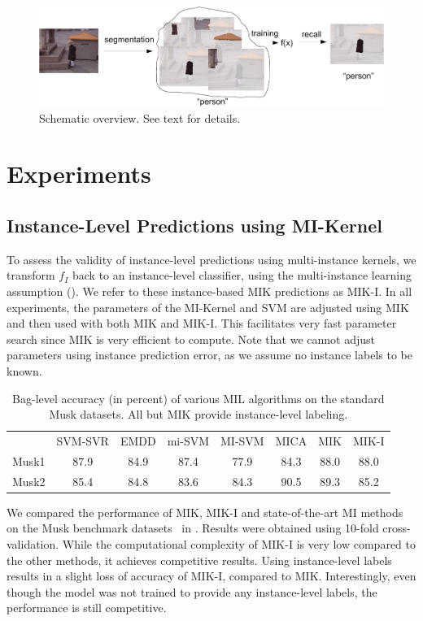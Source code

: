 \begin{figure}[tbp]
	\begin{center}
        \includegraphics[width=\linewidth]{images/scheme-crop.pdf}
	\end{center}
        \caption{Schematic overview. See text for details.}
\end{figure}

\section{Experiments}

\subsection{Instance-Level Predictions using MI-Kernel}

To assess the validity of instance-level predictions using multi-instance
kernels, we transform $f_{I}$ back to an instance-level classifier, using the
multi-instance learning assumption (). We refer to these
instance-based MIK predictions as MIK-I. In all experiments, the
parameters of the MI-Kernel and SVM are adjusted using MIK and then used with
both MIK and MIK-I.  This facilitates very fast parameter search since
MIK is very efficient to compute. Note that we cannot adjust parameters using
instance prediction error, as we assume no instance labels to be known.

\begin{table}
    \centering
    \begin{tabularx}{\linewidth}{@{\extracolsep{\fill}}lccccccc}
    \toprule
        & SVM-SVR & EMDD & mi-SVM & MI-SVM & MICA & MIK & MIK-I \\
    \cmidrule{2-8}
    Musk1 & 87.9 &84.9 &  87.4 &  77.9     & 84.3 & 88.0& 88.0 \\
    Musk2 & 85.4 &84.8 &  83.6 &  84.3     & 90.5 & 89.3& 85.2 \\
    \bottomrule
    \end{tabularx}
    \caption{Bag-level accuracy (in percent) of various MIL algorithms on the standard Musk
    datasets. All but MIK provide instance-level labeling.}
    
\end{table}
We compared the performance of MIK, MIK-I and state-of-the-art MI
methods on the Musk benchmark datasets~\citep{dietterich1997solving} in
. Results were obtained using 10-fold cross-validation. While
the computational complexity of MIK-I is very low compared to the other
methods, it achieves competitive results.  Using instance-level labels results
in a slight loss of accuracy of MIK-I, compared to MIK\@. Interestingly, even
though the model was not trained to provide any instance-level labels, the
performance is still competitive.

